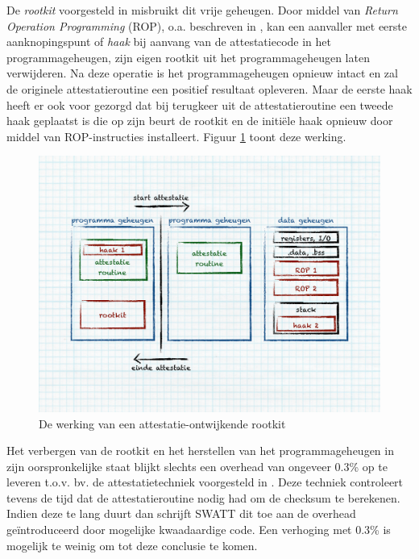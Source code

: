 De \emph{rootkit} voorgesteld in \citep{castelluccia2009difficulty} misbruikt
dit vrije geheugen. Door middel van \emph{Return Operation Programming} (ROP),
o.a. beschreven in \citep{prandini2012return}, kan een aanvaller met eerste
aanknopingspunt of \emph{haak} bij aanvang van de attestatiecode in het
programmageheugen, zijn eigen rootkit uit het programmageheugen laten
verwijderen. Na deze operatie is het programmageheugen opnieuw intact en zal de
originele attestatieroutine een positief resultaat opleveren. Maar de eerste
haak heeft er ook voor gezorgd dat bij terugkeer uit de attestatieroutine een
tweede haak geplaatst is die op zijn beurt de rootkit en de initi\"ele haak
opnieuw door middel van ROP-instructies installeert. Figuur
\ref{fig:attestation-rootkit} toont deze werking.

\begin{figure}[ht]
  \centering
  \includegraphics[width=0.9\linewidth]{resources/attestation-rootkit.pdf}
  \caption{De werking van een attestatie-ontwijkende rootkit}
  \label{fig:attestation-rootkit}
\end{figure}

Het verbergen van de rootkit en het herstellen van het programmageheugen in
zijn oorspronkelijke staat blijkt slechts een overhead van ongeveer 0.3\% op te
leveren t.o.v. bv. de attestatietechniek voorgesteld in
\citep{seshadri2004swatt}. Deze techniek controleert tevens de tijd dat de
attestatieroutine nodig had om de checksum te berekenen. Indien deze te lang
duurt dan schrijft SWATT dit toe aan de overhead ge\"introduceerd door
mogelijke kwaadaardige code. Een verhoging met 0.3\% is mogelijk te weinig om
tot deze conclusie te komen.

